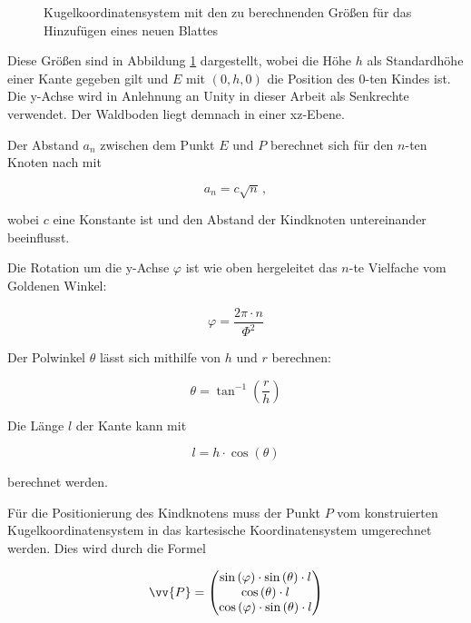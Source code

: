 \begin{figure}[htb]
  
  \caption{Kugelkoordinatensystem mit den zu berechnenden Größen für das Hinzufügen eines neuen Blattes}
  \label{fig:spherical-coordinates}
\end{figure}

Diese Größen sind in Abbildung \ref{fig:spherical-coordinates} dargestellt, wobei die Höhe $h$ als Standardhöhe einer Kante gegeben gilt und $E$ mit $(0, h, 0)$ die Position des $0$-ten Kindes ist. Die y-Achse wird in Anlehnung an Unity in dieser Arbeit als Senkrechte verwendet. Der Waldboden liegt demnach in einer xz-Ebene.

Der Abstand $a_n$ zwischen dem Punkt $E$ und $P$ berechnet sich für den $n$-ten Knoten nach \cite{vogel1979better} mit

\begin{equation}
\label{eq:r}
  a_n = c \sqrt{n} \,,
\end{equation}

wobei $c$ eine Konstante ist und den Abstand der Kindknoten untereinander beeinflusst.

Die Rotation um die y-Achse $\varphi$ ist wie oben hergeleitet das $n$-te Vielfache vom Goldenen Winkel:

\begin{equation}
  \varphi = \frac{2\pi \cdot n}{\Phi^{2}}
\end{equation}

Der Polwinkel $\theta$ lässt sich mithilfe von $h$ und $r$ berechnen:

\begin{equation}
  \theta = \tan^{-1} \left(\frac{r}{h}\right)
\end{equation}

Die Länge $l$ der Kante kann mit

\begin{equation}
  l = h \cdot \cos\left(\theta\right)
\end{equation}

berechnet werden.

Für die Positionierung des Kindknotens muss der Punkt $P$ vom konstruierten Kugelkoordinatensystem in das kartesische Koordinatensystem umgerechnet werden. Dies wird durch die Formel

\begin{equation}
  \vv{P} =
  \begin{pmatrix}
    \sin\left(\varphi\right) \cdot \sin\left(\theta\right) \cdot l\\
    \cos\left(\theta\right) \cdot l\\
    \cos\left(\varphi\right) \cdot \sin\left(\theta\right) \cdot l
  \end{pmatrix}
\end{equation}

